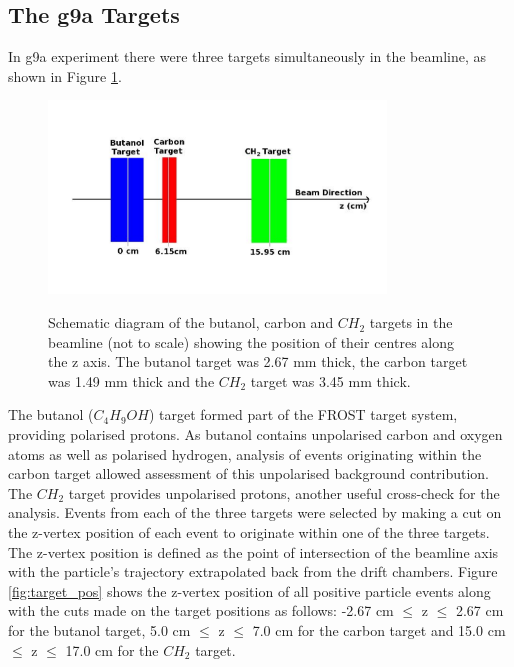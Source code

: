 \subsection{The g9a Targets}
In g9a experiment there were three targets simultaneously in the beamline, as shown in Figure \ref{fig:target_draw}.
\begin{figure}[htb]
  \includegraphics[width=0.8\textwidth]{figures/targets_drawing.png} \\
  \caption{Schematic diagram of the butanol, carbon and $CH_2$ targets in the beamline (not to scale) showing the position of their centres along the z axis. The butanol target was 2.67 mm thick, the carbon target was 1.49 mm thick and the $CH_2$ target was 3.45 mm thick. }
  \label{fig:target_draw}
\end{figure}
The butanol ($C_4 H_9OH$) target formed part of the FROST target system,  providing polarised protons. As butanol contains unpolarised carbon and oxygen atoms as well as polarised hydrogen, analysis of events originating within the carbon target allowed assessment of this unpolarised background contribution. The $CH_2$ target provides unpolarised protons, another useful cross-check for the analysis. Events from each of the three targets were selected by making a cut on the z-vertex position of each event to originate within one of the three targets. The z-vertex position is defined as the point of intersection of the beamline axis with the particle’s trajectory extrapolated back from the drift chambers. Figure \ref{fig:target_pos} shows the z-vertex position of all positive particle events along with the cuts made on the target positions as follows: -2.67 cm $\leq$ z $\leq$ 2.67 cm for the butanol target, 5.0 cm $\leq$ z $\leq$ 7.0 cm for the carbon target and 15.0 cm $\leq$ z $\leq$ 17.0 cm for the $CH_2$ target.
